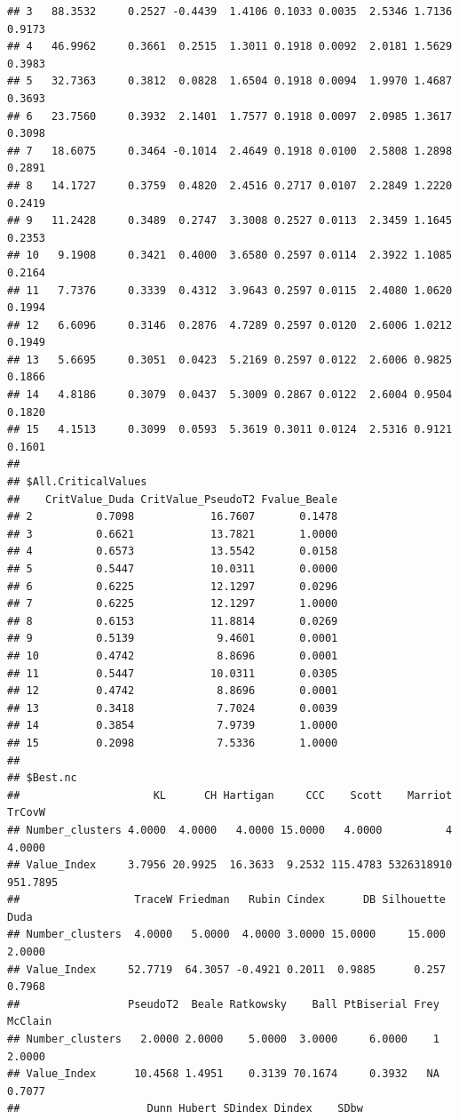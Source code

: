 \documentclass[
]{article}
\begin{document}
\begin{verbatim}
## 3   88.3532     0.2527 -0.4439  1.4106 0.1033 0.0035  2.5346 1.7136 0.9173
## 4   46.9962     0.3661  0.2515  1.3011 0.1918 0.0092  2.0181 1.5629 0.3983
## 5   32.7363     0.3812  0.0828  1.6504 0.1918 0.0094  1.9970 1.4687 0.3693
## 6   23.7560     0.3932  2.1401  1.7577 0.1918 0.0097  2.0985 1.3617 0.3098
## 7   18.6075     0.3464 -0.1014  2.4649 0.1918 0.0100  2.5808 1.2898 0.2891
## 8   14.1727     0.3759  0.4820  2.4516 0.2717 0.0107  2.2849 1.2220 0.2419
## 9   11.2428     0.3489  0.2747  3.3008 0.2527 0.0113  2.3459 1.1645 0.2353
## 10   9.1908     0.3421  0.4000  3.6580 0.2597 0.0114  2.3922 1.1085 0.2164
## 11   7.7376     0.3339  0.4312  3.9643 0.2597 0.0115  2.4080 1.0620 0.1994
## 12   6.6096     0.3146  0.2876  4.7289 0.2597 0.0120  2.6006 1.0212 0.1949
## 13   5.6695     0.3051  0.0423  5.2169 0.2597 0.0122  2.6006 0.9825 0.1866
## 14   4.8186     0.3079  0.0437  5.3009 0.2867 0.0122  2.6004 0.9504 0.1820
## 15   4.1513     0.3099  0.0593  5.3619 0.3011 0.0124  2.5316 0.9121 0.1601
## 
## $All.CriticalValues
##    CritValue_Duda CritValue_PseudoT2 Fvalue_Beale
## 2          0.7098            16.7607       0.1478
## 3          0.6621            13.7821       1.0000
## 4          0.6573            13.5542       0.0158
## 5          0.5447            10.0311       0.0000
## 6          0.6225            12.1297       0.0296
## 7          0.6225            12.1297       1.0000
## 8          0.6153            11.8814       0.0269
## 9          0.5139             9.4601       0.0001
## 10         0.4742             8.8696       0.0001
## 11         0.5447            10.0311       0.0305
## 12         0.4742             8.8696       0.0001
## 13         0.3418             7.7024       0.0039
## 14         0.3854             7.9739       1.0000
## 15         0.2098             7.5336       1.0000
## 
## $Best.nc
##                     KL      CH Hartigan     CCC    Scott    Marriot   TrCovW
## Number_clusters 4.0000  4.0000   4.0000 15.0000   4.0000          4   4.0000
## Value_Index     3.7956 20.9925  16.3633  9.2532 115.4783 5326318910 951.7895
##                  TraceW Friedman   Rubin Cindex      DB Silhouette   Duda
## Number_clusters  4.0000   5.0000  4.0000 3.0000 15.0000     15.000 2.0000
## Value_Index     52.7719  64.3057 -0.4921 0.2011  0.9885      0.257 0.7968
##                 PseudoT2  Beale Ratkowsky    Ball PtBiserial Frey McClain
## Number_clusters   2.0000 2.0000    5.0000  3.0000     6.0000    1  2.0000
## Value_Index      10.4568 1.4951    0.3139 70.1674     0.3932   NA  0.7077
##                    Dunn Hubert SDindex Dindex    SDbw

\end{verbatim}
\end{document}
